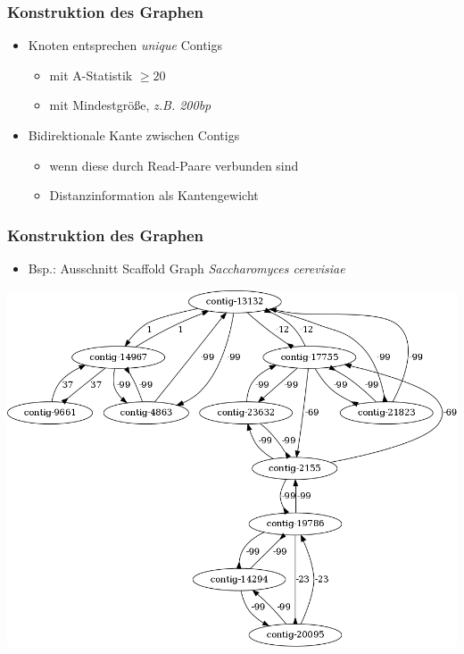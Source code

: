 \documentclass[xcolor=pst]{beamer}
\begin{document}
\begin{frame}
  \frametitle{Konstruktion des Graphen}
  \begin{itemize}
    \item Knoten entsprechen \textit{unique} Contigs
    \begin{itemize}
      \item mit A-Statistik $\geq 20$
      \item mit Mindestgröße, \textit{z.B. 200bp}
    \end{itemize}
    \item Bidirektionale Kante zwischen Contigs
    \begin{itemize}
      \item wenn diese durch Read-Paare verbunden sind
      \item Distanzinformation als Kantengewicht
    \end{itemize}
  \end{itemize}
\end{frame}

\begin{frame}
  \frametitle{Konstruktion des Graphen}
  \begin{itemize}
    \item Bsp.: Ausschnitt Scaffold Graph \textit{Saccharomyces cerevisiae}
  \end{itemize}
  \begin{center}
    \includegraphics[scale=0.25]{figures/s_cerevisiae_parsed_graph_example_small.png}
  \end{center}
\end{frame}
\end{document}

